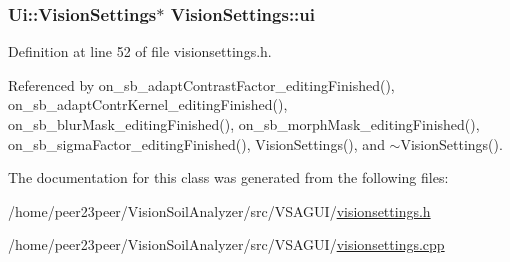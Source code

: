 \hypertarget{class_vision_settings_a31bed09e4ffe883c2f352ecbb3682a8f}{}
\subsubsection[{ui}]{\setlength{\rightskip}{0pt plus 5cm}Ui\+::\+Vision\+Settings$\ast$ Vision\+Settings\+::ui\hspace{0.3cm}{\ttfamily [private]}}\label{class_vision_settings_a31bed09e4ffe883c2f352ecbb3682a8f}


Definition at line 52 of file visionsettings.\+h.



Referenced by on\+\_\+sb\+\_\+adapt\+Contrast\+Factor\+\_\+editing\+Finished(), on\+\_\+sb\+\_\+adapt\+Contr\+Kernel\+\_\+editing\+Finished(), on\+\_\+sb\+\_\+blur\+Mask\+\_\+editing\+Finished(), on\+\_\+sb\+\_\+morph\+Mask\+\_\+editing\+Finished(), on\+\_\+sb\+\_\+sigma\+Factor\+\_\+editing\+Finished(), Vision\+Settings(), and $\sim$\+Vision\+Settings().



The documentation for this class was generated from the following files\+:\begin{DoxyCompactItemize}
\item 
/home/peer23peer/\+Vision\+Soil\+Analyzer/src/\+V\+S\+A\+G\+U\+I/\hyperlink{visionsettings_8h}{visionsettings.\+h}\item 
/home/peer23peer/\+Vision\+Soil\+Analyzer/src/\+V\+S\+A\+G\+U\+I/\hyperlink{visionsettings_8cpp}{visionsettings.\+cpp}\end{DoxyCompactItemize}
